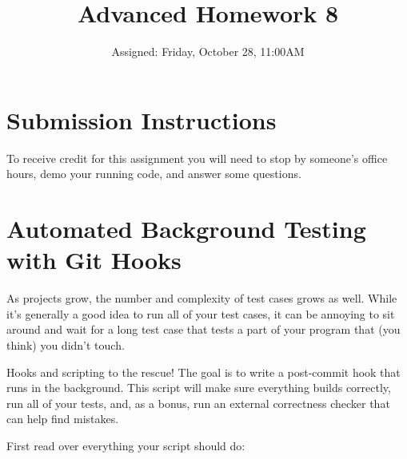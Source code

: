 \documentclass{article}
\begin{document}
\fancyfoot[C]{\color{gray} \thepage~/~\pageref*{LastPage}}
\pagestyle{fancyplain}


\title{\textbf{Advanced Homework 8\\}}
\author{Assigned: Friday, October 28, 11:00AM}
\date{\textbf{\color{red}{Due: Before November 12, 10:00PM}}}
\maketitle


\section*{Submission Instructions}
To receive credit for this assignment you will need to stop by someone's
office hours, demo your running code, and answer some questions.

\section{Automated Background Testing with Git Hooks}

As projects grow, the number and complexity of test cases grows as well. While
it's generally a good idea to run all of your test cases, it can be annoying
to sit around and wait for a long test case that tests a part of your program
that (you think) you didn't touch.

\medskip
\noindent
Hooks and scripting to the rescue! The goal is to write a post-commit hook
that runs in the background. This script will make sure everything builds
correctly, run all of your tests, and, as a bonus, run an external correctness
checker that can help find mistakes.

\medskip
\noindent
First read over everything your script should do:
\end{document}
